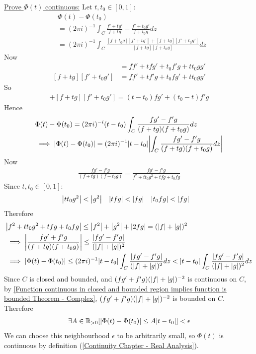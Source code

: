 \documentclass[12pt, english]{book}
\makeatletter
\renewenvironment{proof}[1][\proofname]{\par
	\pushQED{\qed}%
	\normalfont \topsep6\p@\@plus6\p@\relax
	\list{}{%
		\settowidth{\leftmargin}{\itshape\proofname:\hskip\labelsep}%
		\setlength{\labelwidth}{0pt}%
		\setlength{\itemindent}{-\leftmargin}%
		}%
	\item[\hskip\labelsep\itshape#1\@addpunct{:}]\ignorespaces
	}{\popQED\endlist\@endpefalse}
\makeatother
\begin{document}
\begin{example}
\begin{proof}
{			\underline{Prove \(\Phi(t)\) continuous:} \newline
			Let \(t, t_0 \in [0,1]\):
			\begin{align*}
				&\Phi(t) - \Phi(t_0) \\
				&= (2\pi i)^{-1} \int_{C} \frac{f' + t g'}{f + t g} - \frac{f' + t_0 g'}{f + t_0 g} dz \\
				&= (2\pi i)^{-1} \int_{C} 
					\frac{[f + t_0 g][f' + tg'] + [f + t g][f' + t_0 g']}{[f + tg][f + t_0 g]} dz
			\end{align*}
			Now
			\begin{align*}
				[f + t_0 g][f' + tg'] 
				&= ff' + tfg' + t_0 f'g + tt_0 gg' \\
				[f + t g][f' + t_0 g']
				&= ff' + tf'g + t_0 fg' + tt_0 gg'
			\end{align*}
			So
			\begin{align*}
				[f + t_0 g][f' + tg'] + [f + t g][f' + t_0 g']
				= (t-t_0) fg' + (t_0 - t) f'g
			\end{align*}
			Hence 
			\begin{align*}
				&\Phi(t) - \Phi(t_0) = (2\pi i)^{-i} (t-t_0) \int_{C} \frac{fg' - f'g}{(f + tg) (f+t_0 g)} dz \\
				&\implies \abs{\Phi(t) - \Phi(t_0)} = (2\pi i)^{-1} \abs{t-t_0} \abs{\int_{C} \frac{fg' - f'g}{(f + tg) (f+t_0 g)} dz}
			\end{align*}
			Now 
			\begin{align*}
				\frac{fg' - f'g}{(f+tg)(f-t_0 g)} = \frac{fg' - f'g}{f^2 + tt_0 g^2 + tfg + t_0 fg}
			\end{align*}
			Since \(t, t_0 \in [0,1]\):
			\begin{align*}
				\abs{tt_0 g^2} &< \abs{g^2} & \abs{tfg} &< \abs{fg} & \abs{t_0 fg} &< \abs{fg}
			\end{align*}
			Therefore
			\begin{align*}
				&\abs{f^2 + tt_0 g^2 + tfg + t_0 fg} \leq \abs{f^2} + \abs{g^2} + \abs{2fg} = (\abs{f}+\abs{g})^2 \\
				&\implies \abs{\frac{fg' + f'g}{(f+ tg)(f+t_0 g)}} \leq \frac{\abs{fg' - f'g}}{(\abs{f} + \abs{g})^2} \\
				&\implies \abs{\Phi(t) - \Phi(t_0)} 
					\leq (2\pi i)^{-1} \abs{t-t_0} \int_{C} \frac{\abs{fg' - f'g}}{(\abs{f} + \abs{g})^2} dz 
					< \abs{t-t_0} \int_{C} \frac{\abs{fg' - f'g}}{(\abs{f} + \abs{g})^2} dz 
			\end{align*}
			Since \(C\) is closed and bounded, and \((fg' + f'g)(\abs{f}+\abs{g})^{-2}\) is continuous on \(C\), by \cref{Function continuous in closed and bounded region implies function is bounded Theorem - Complex}, \((fg' + f'g)(\abs{f}+\abs{g})^{-2}\) is bounded on \(C\). Therefore
			\begin{align*}
				\exists A \in \mathbb{R}_{>0} [\abs{\Phi(t) - \Phi(t_0)} \leq A\abs{t-t_0}] < \epsilon
			\end{align*}
			We can choose this neighbourhood \(\epsilon\) to be arbitrarily small, so \(\Phi(t)\) is continuous by definition (\cref{Continuity Chapter - Real Analysis}).
			
}
\end{proof}
\end{example}
\end{document}
